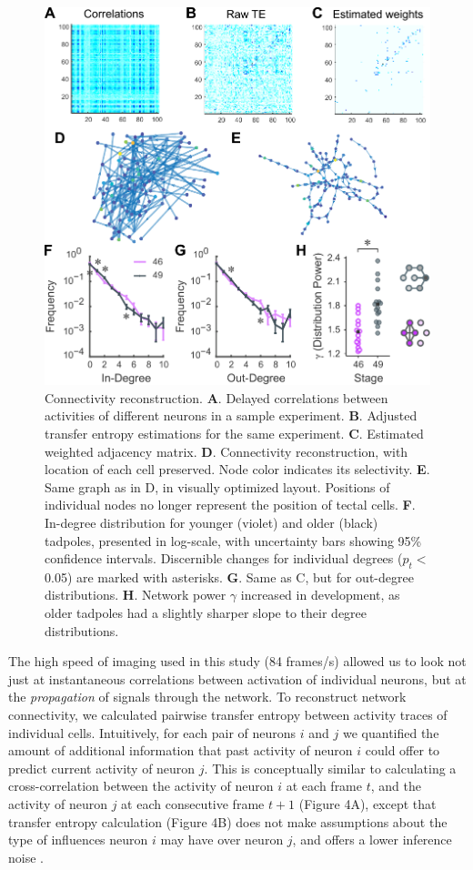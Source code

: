\documentclass{article}
\begin{document}
\begin{figure}[t!]
\includegraphics[width=\linewidth]{fig4.pdf}
\caption{
Connectivity reconstruction.  \textbf{A}. Delayed correlations between activities of different neurons in a sample experiment. \textbf{B}. Adjusted transfer entropy estimations for the same experiment. \textbf{C}. Estimated weighted adjacency matrix. \textbf{D}. Connectivity reconstruction, with location of each cell preserved. Node color indicates its selectivity. \textbf{E}. Same graph as in D, in visually optimized layout. Positions of individual nodes no longer represent the position of tectal cells. \textbf{F}. In-degree distribution for younger (violet) and older (black) tadpoles, presented in log-scale, with uncertainty bars showing 95\% confidence intervals. Discernible changes for individual degrees ($p_t<$ 0.05) are marked with asterisks. \textbf{G}. Same as C, but for out-degree distributions. \textbf{H}. Network power $\gamma$ increased in development, as older tadpoles had a slightly sharper slope to their degree distributions. }
\end{figure}

The high speed of imaging used in this study (84 frames/s) allowed us to look not just at instantaneous correlations between activation of individual neurons, but at the \textit{propagation} of signals through the network. To reconstruct network connectivity, we calculated pairwise transfer entropy \citep{gourevitch2007te, stetter2012te} between activity traces of individual cells. Intuitively, for each pair of neurons $i$ and $j$ we quantified the amount of additional information that past activity of neuron $i$ could offer to predict current activity of neuron $j$. This is conceptually similar to calculating a cross-correlation between the activity of neuron $i$ at each frame $t$, and the activity of neuron $j$ at each consecutive frame $t+1$ (Figure 4A), except that transfer entropy calculation (Figure 4B) does not make assumptions about the type of influences neuron $i$ may have over neuron $j$, and offers a lower inference noise \citep{stetter2012te}.
\end{document}
